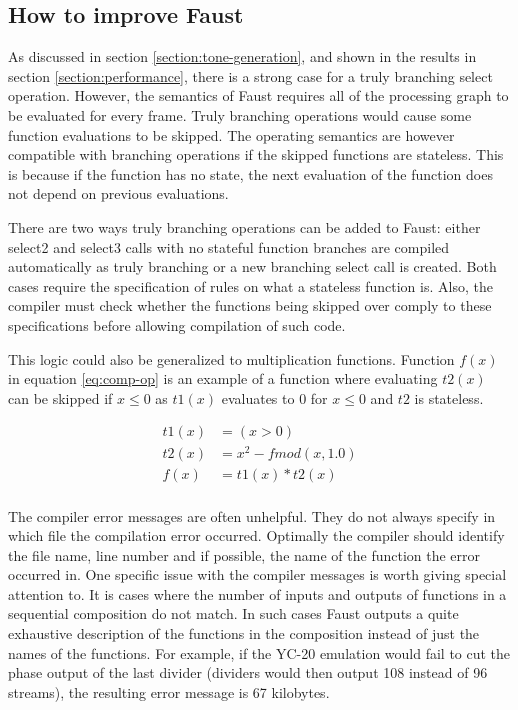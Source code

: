 \documentclass[11pt,a4paper]{article}
\begin{document}
\subsection{How to improve Faust}

As discussed in section \ref{section:tone-generation}, and shown in the results in section \ref{section:performance}, there is a strong case for a truly branching select operation. However, the semantics of Faust requires all of the processing graph to be evaluated for every frame. Truly branching operations would cause some function evaluations to be skipped. The operating semantics are however compatible with branching operations if the skipped functions are stateless. This is because if the function has no state, the next evaluation of the function does not depend on previous evaluations.

There are two ways truly branching operations can be added to Faust: either select2 and select3 calls with no stateful function branches are compiled automatically as truly branching or a new branching select call is created. Both cases require the specification of rules on what a stateless function is. Also, the compiler must check whether the functions being skipped over comply to these specifications before allowing compilation of such code.

This logic could also be generalized to multiplication functions. Function $f(x)$ in equation \ref{eq:comp-op} is an example of a function where evaluating $t2(x)$ can be skipped if $x \leq 0$ as $t1(x)$ evaluates to 0 for $x \leq 0 $ and $t2$ is stateless.

\begin{equation}
\label{eq:comp-op}
\begin{split}
t1(x) &= (x>0) \\
t2(x) &= x^2-fmod(x,1.0) \\
f(x)  &= t1(x) * t2(x) \\
\end{split}
\end{equation}


The compiler error messages are often unhelpful. They do not always specify in which file the compilation error occurred. Optimally the compiler should identify the file name, line number and if possible, the name of the function the error occurred in. One specific issue with the compiler messages is worth giving special attention to. It is cases where the number of inputs and outputs of functions in a sequential composition do not match. In such cases Faust outputs a quite exhaustive description of the functions in the composition instead of just the names of the functions. For example, if the YC-20 emulation would fail to cut the phase output of the last divider (dividers would then output 108 instead of 96 streams), the resulting error message is 67 kilobytes.
\end{document}
